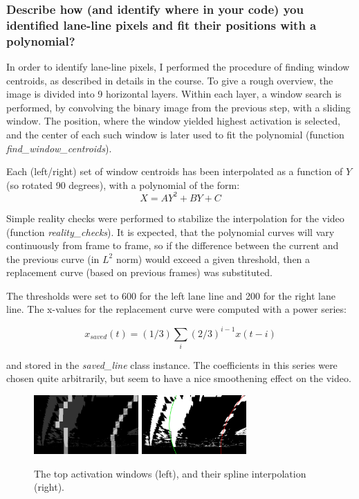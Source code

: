 \documentclass[a4paper,10pt]{article}
\begin{document}
\subsubsection{Describe how (and identify where in your code) you identified lane-line pixels and fit their positions with a polynomial?}

In order to identify lane-line pixels, I performed the procedure of finding window centroids, as described in details in the course.
To give a rough overview, the image is divided into 9 horizontal layers. Within each layer, a window search is performed,
by convolving the binary image from the previous step, with a sliding window. 
The position, where the window yielded highest activation is selected,
and the center of each such window is later used to fit the polynomial (function \emph{find\_window\_centroids}).

Each (left/right) set of window centroids has been interpolated as a function of $Y$ (so rotated 90 degrees), with a polynomial of the form:
%
$$
 X = AY^2 + BY + C
$$

Simple reality checks were performed to stabilize the interpolation for the video (function \emph{reality\_checks}).
It is expected, that the polynomial curves will vary continuously from frame to frame,
so if the difference between the current and the previous curve (in $L^2$ norm) would exceed a given threshold,
then a replacement curve (based on previous frames) was substituted.

The thresholds were set to 600 for the left lane line and 200 for the right lane line.
The x-values for the replacement curve were computed with a power series:

$$
x_{saved}(t) = (1/3) \sum_{i} (2/3)^{i-1}x(t-i) 
$$

and stored in the \emph{saved\_line} class instance.
The coefficients in this series were chosen quite arbitrarily, but seem to have a nice smoothening effect on the video.

\begin{figure}[h]
  \begin{center}
    \includegraphics[width=40mm]{../output_images/centroids.jpg}
    \quad
    \includegraphics[width=40mm]{../output_images/line_image.jpg}
  \caption{The top activation windows (left), and their spline interpolation (right).}
\end{center}
\end{figure}
\end{document}
